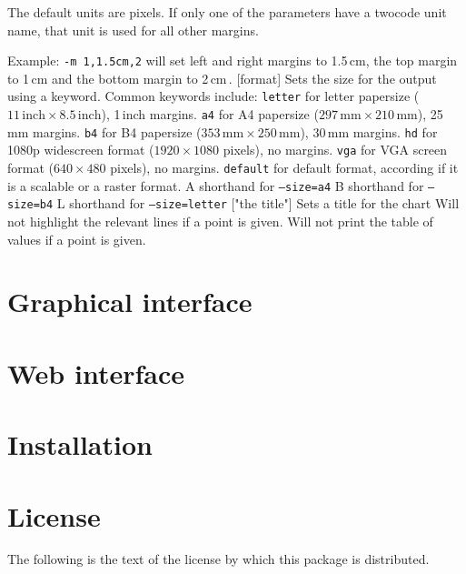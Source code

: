 \documentclass[letterpaper]{article}
\begin{document}
\begin{clioptions}
  The default units are pixels. If only one of the parameters have a
  twocode unit name, that unit is used for all other margins.
  
  Example: \texttt{-m 1,1.5cm,2} will set left and right margins to
  1.5\,cm, the top margin to 1\,cm and the bottom margin to 2\,cm\,.
[format] Sets the size for the output using a
  keyword. Common keywords include:
  \texttt{letter} for letter papersize ($11\,\textrm{inch}\times8.5\,\textrm{inch}$), 1\,inch margins.
  \texttt{a4} for A4 papersize ($297\,\textrm{mm}\times210\,\textrm{mm}$), 25\,mm margins.
  \texttt{b4} for B4 papersize ($353\,\textrm{mm}\times250\,\textrm{mm}$), 30\,mm margins.
  \texttt{hd} for 1080p widescreen format ($1920\times1080$ pixels), no margins.
  \texttt{vga} for VGA screen format ($640\times480$ pixels), no margins.
  \texttt{default} for default format, according if it is a scalable or a raster format.
\cliop A shorthand for \texttt{--size=a4}
\cliop B shorthand for \texttt{--size=b4}
\cliop L shorthand for \texttt{--size=letter}
["the title"] Sets a title for the chart
 Will not highlight the relevant lines if a point is given.
 Will not print the table of values if a point is given.
\end{clioptions}
\section{Graphical interface}
\section{Web interface}
\section{Installation}
\section{License}
The following is the text of the license by which this package is distributed.

\end{document}
